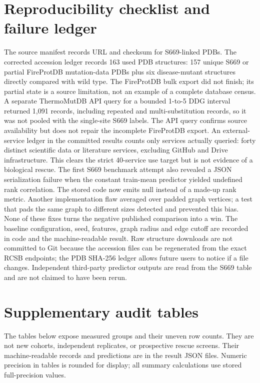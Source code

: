 \documentclass[11pt]{article}
\begin{document}
\section{Reproducibility checklist and failure ledger}
The source manifest records URL and checksum for S669-linked PDBs. The corrected accession ledger records 163 used PDB structures: 157 unique S669 or partial FireProtDB mutation-data PDBs plus six disease-mutant structures directly compared with wild type. The FireProtDB bulk export did not finish; its partial state is a source limitation, not an example of a complete database census. A separate ThermoMutDB API query for a bounded 1-to-5 DDG interval returned 1,091 records, including repeated and multi-substitution records, so it was not pooled with the single-site S669 labels. The API query confirms source availability but does not repair the incomplete FireProtDB export. An external-service ledger in the committed results counts only services actually queried: forty distinct scientific data or literature services, excluding GitHub and Drive infrastructure. This clears the strict 40-service use target but is not evidence of a biological rescue. The first S669 benchmark attempt also revealed a JSON serialization failure when the constant train-mean predictor yielded undefined rank correlation. The stored code now emits null instead of a made-up rank metric. Another implementation flaw averaged over padded graph vertices; a test that pads the same graph to different sizes detected and prevented this bias. None of these fixes turns the negative published comparison into a win. The baseline configuration, seed, features, graph radius and edge cutoff are recorded in code and the machine-readable result. Raw structure downloads are not committed to Git because the accession files can be regenerated from the exact RCSB endpoints; the PDB SHA-256 ledger allows future users to notice if a file changes. Independent third-party predictor outputs are read from the S669 table and are not claimed to have been rerun.
\clearpage
\section{Supplementary audit tables}
The tables below expose measured groups and their uneven row counts. They are not new cohorts, independent replicates, or prospective rescue screens. Their machine-readable records and predictions are in the result JSON files. Numeric precision in tables is rounded for display; all summary calculations use stored full-precision values.
\end{document}
